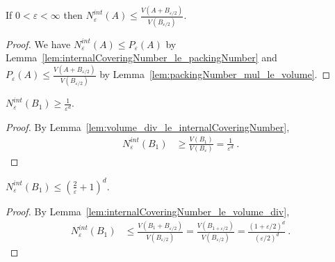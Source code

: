 \begin{lemma}\label{lem:internalCoveringNumber_le_volume_div}
  \leanok
If $0 < \varepsilon < \infty$ then $N^{int}_\varepsilon(A) \le \frac{V(A + B_{\varepsilon/2})}{V(B_{\varepsilon/2})}$.
\end{lemma}

\begin{proof}\leanok
We have $N^{int}_\varepsilon(A) \le P_\varepsilon(A)$ by Lemma~\ref{lem:internalCoveringNumber_le_packingNumber} and $P_\varepsilon(A) \le \frac{V(A + B_{\varepsilon/2})}{V(B_{\varepsilon/2})}$ by Lemma~\ref{lem:packingNumber_mul_le_volume}.
\end{proof}


\begin{lemma}\label{lem:internalCoveringNumber_closedBall_ge}
  \leanok
$N_\varepsilon^{int}(B_1) \ge \frac{1}{\varepsilon^d}$.
\end{lemma}

\begin{proof}\leanok
By Lemma~\ref{lem:volume_div_le_internalCoveringNumber},
\begin{align*}
  N^{int}_\varepsilon(B_1)
  &\ge \frac{V(B_1)}{V(B_\varepsilon)}
  = \frac{1}{\varepsilon^d}
  \: .
\end{align*}

\end{proof}


\begin{lemma}\label{lem:internalCoveringNumber_closedBall_le}
  \leanok
$N_\varepsilon^{int}(B_1) \le \left(\frac{2}{\varepsilon} + 1\right)^d$.
\end{lemma}

\begin{proof}\leanok
By Lemma~\ref{lem:internalCoveringNumber_le_volume_div},
\begin{align*}
  N^{int}_\varepsilon(B_1)
  &\le \frac{V(B_1 + B_{\varepsilon/2})}{V(B_{\varepsilon/2})}
  = \frac{V(B_{1 + \varepsilon/2})}{V(B_{\varepsilon/2})}
  = \frac{(1 + \varepsilon/2)^d}{(\varepsilon/2)^d}
  \: .
\end{align*}
\end{proof}



